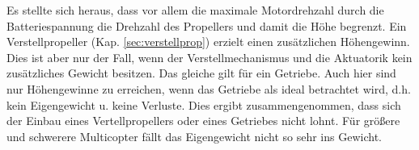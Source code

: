 Es stellte sich heraus, dass vor allem die maximale Motordrehzahl durch die Batteriespannung die Drehzahl des Propellers und damit die Höhe begrenzt. Ein Verstellpropeller (Kap. \ref{sec:verstellprop}) erzielt einen zusätzlichen Höhengewinn. Dies ist aber nur der Fall, wenn der Verstellmechanismus und die Aktuatorik kein zusätzliches Gewicht besitzen. Das gleiche gilt für ein Getriebe. Auch hier sind nur Höhengewinne zu erreichen, wenn das Getriebe als ideal betrachtet wird, d.h. kein Eigengewicht u. keine Verluste. Dies ergibt zusammengenommen, dass sich der Einbau eines Vertellpropellers oder eines Getriebes nicht lohnt. Für größere und schwerere Multicopter fällt das Eigengewicht nicht so sehr ins Gewicht. 





